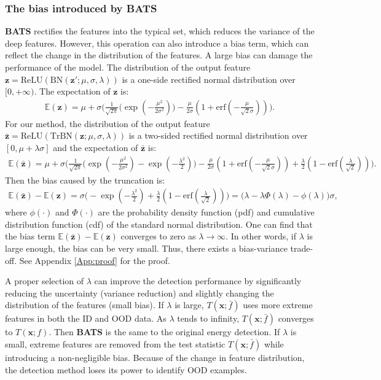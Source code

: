 \documentclass{article}
\newcommand{\benr}{\begin{eqnarray}}
\newcommand{\eenr}{\end{eqnarray}}
\def\rvx{{\mathbf{x}}}
\def\rvz{{\mathbf{z}}}
\newcommand{\E}{\mathbb{E}}
\begin{document}
\subsubsection{The bias introduced by BATS}
\textbf{BATS} rectifies the features into the typical set, which reduces the variance of the deep features. However, this operation can also introduce a bias term, which can reflect the change in the distribution of the features. A large bias can damage the performance of the model.  The distribution of the output feature $\rvz = \text{ReLU}(\text{BN}(\rvz'; \mu, \sigma, \lambda))$ is a one-side rectified normal distribution over $[0, +\infty).$ The expectation of $\rvz$ is:
\benr
\E(\rvz) = \mu + \sigma \Big(\frac{1}{\sqrt{2\pi}} \big( \exp(-\frac{\mu^2}{2\sigma^2})  \big)   - \frac{\mu}{2\sigma}(1+\text{erf}(-\frac{\mu}{\sqrt{2}\sigma})) \Big).
\eenr
For our method, the distribution of the output feature $\bar \rvz = \text{ReLU}(\text{TrBN}(\rvz; \mu, \sigma, \lambda))$ is a {two-sided} rectified normal distribution over $[0, \mu+\lambda\sigma]$ and the expectation of $\bar \rvz$ is:
\benr
\E(\bar \rvz) = \mu + \sigma \Big(\frac{1}{\sqrt{2\pi}} \big( \exp(-\frac{\mu^2}{2\sigma^2}) - \exp(-\frac{\lambda^2}{2})  \big)   - \frac{\mu}{2\sigma}(1+\text{erf}(-\frac{\mu}{\sqrt{2}\sigma})) + \frac{\lambda}{2} (1-\text{erf}(\frac{\lambda}{\sqrt 2}))\Big).
\eenr
Then the bias caused by the truncation is:
\benr
\E(\bar \rvz)-\E(\rvz) = \sigma\Big( - \exp(-\frac{\lambda^2}{2}) + \frac{\lambda}{2} (1-\text{erf}(\frac{\lambda}{\sqrt 2})) \Big) = \big(\lambda - \lambda \Phi(\lambda) - \phi(\lambda)\big)\sigma,
\eenr
where $\phi(\cdot)$ and $\Phi(\cdot)$ are the probability density function (pdf) and cumulative distribution function (cdf) of the standard normal distribution. One can find that the bias term $\E(\bar \rvz)-\E(\rvz)$ converges to zero as $\lambda \to \infty.$ In other words, if $\lambda$ is large enough, the bias can be very small. Thus, there exists a bias-variance trade-off. See Appendix \ref{App:proof} for the proof.

A proper selection of $\lambda$ can improve the detection performance by significantly reducing the uncertainty (variance reduction) and slightly changing the distribution of the features (small bias). 
If $\lambda$ is large, $T(\rvx; \bar f)$ uses more extreme features in both the ID and OOD data.
As $\lambda$ tends to infinity,  $T(\rvx; \bar f)$ converges to $T(\rvx; f).$
Then \textbf{BATS} is the same to the original energy detection.
If $\lambda$ is small, extreme features are removed from the test statistic $T(\rvx; \bar f)$ while introducing a non-negligible bias.
Because of the change in feature distribution, the detection method loses its power to identify OOD examples.
\end{document}
